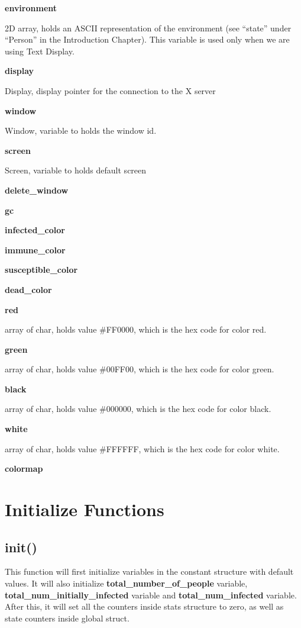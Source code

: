 \documentclass[letterpaper,10pt,openany,oneside]{sphinxmanual}
\begin{document}
\textbf{environment}

2D array, holds an ASCII representation of the environment (see “state” under “Person” in the Introduction Chapter). This variable is used only when we are using Text Display.

\textbf{display}

Display, display pointer for the connection to the X server

\textbf{window}

Window, variable to holds the window id.

\textbf{screen}

Screen, variable to holds default screen

\textbf{delete\_window}

\textbf{gc}

\textbf{infected\_color}

\textbf{immune\_color}

\textbf{susceptible\_color}

\textbf{dead\_color}

\textbf{red}

array of char, holds value \#FF0000, which is the hex code for color red.

\textbf{green}

array of char, holds value \#00FF00, which is the hex code for color green.

\textbf{black}

array of char, holds value \#000000, which is the hex code for color black.

\textbf{white}

array of char, holds value \#FFFFFF, which is the hex code for color white.

\textbf{colormap}


\chapter{Initialize Functions}
\label{3-Initialize/initialize:initialize-functions}\label{3-Initialize/initialize::doc}

\section{init()}
\label{3-Initialize/initialize:init}
This function will first initialize variables in the constant structure with default values. It will also initialize \textbf{total\_number\_of\_people} variable, \textbf{total\_num\_initially\_infected} variable and \textbf{total\_num\_infected} variable. After this, it will set all the counters inside stats structure to zero, as well as state counters inside global struct.
\end{document}
